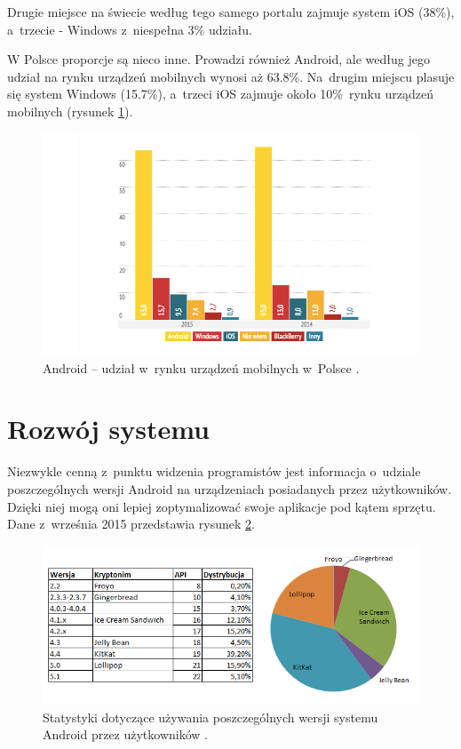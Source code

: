 Drugie miejsce na świecie według tego samego portalu zajmuje system iOS (38\%), a~trzecie - Windows z~niespełna 3\% udziału. 

W Polsce proporcje są nieco inne. Prowadzi również Android, ale według \cite{website:android:stat1} jego udział na rynku urządzeń mobilnych wynosi aż 63.8\%. Na~drugim miejscu plasuje się system Windows (15.7\%), a~trzeci iOS zajmuje około 10\%~rynku urządzeń mobilnych (rysunek \ref{fig:android_udzial_polska}).

\begin{figure}[!htb]
    \centering
    \includegraphics[width=15cm]{imgs/ch2_android_udzial_1.png}
    \caption
{Android – udział w~rynku urządzeń mobilnych w~Polsce \cite{website:android:stat1}.}
    \label{fig:android_udzial_polska}
\end{figure} 

\newpage

\section{Rozwój systemu}
Niezwykle cenną z~punktu widzenia programistów jest informacja o~udziale poszczególnych wersji Android na urządzeniach posiadanych przez użytkowników. Dzięki niej mogą oni lepiej zoptymalizować swoje aplikacje pod kątem sprzętu. Dane z~września 2015 przedstawia rysunek \ref{fig:android_udzial_wersje}.

\begin{figure}[!htb]
    \centering
    \includegraphics[width=17cm]{imgs/ch2_android_udzial_3pl.png}
    \caption
{Statystyki dotyczące używania poszczególnych wersji systemu Android przez użytkowników \cite{website:android:now}.}
    \label{fig:android_udzial_wersje}
\end{figure} 

